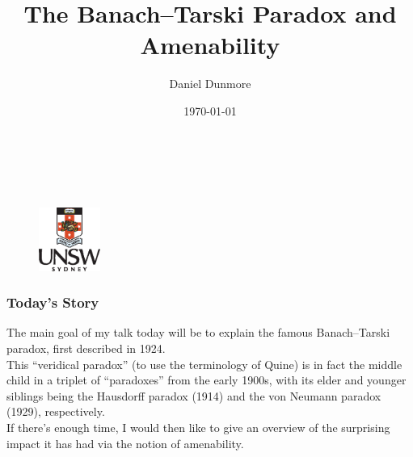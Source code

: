 \documentclass{beamer}
\title[The Banach--Tarski Paradox and Amenability]{The Banach--Tarski Paradox and Amenability}
\author{Daniel Dunmore}
\institute[UNSW]{
	University of New South Wales \\
	\medskip
	\textit{d.dunmore@unsw.edu.au}
}
\date{\today}
\begin{document}

\begin{frame}
\noindent\\[-20pt]
\begin{figure}[!ht]
\titlepage
\noindent\\[-20pt]
\hspace{3.5cm}\hfill\includegraphics[width=2cm]{unsw-crest}\hfill{}
\end{figure}
\end{frame}

\begin{frame}
\frametitle{Today's Story}
\noindent The main goal of my talk today will be to explain the famous Banach--Tarski paradox, first described in 1924.\\[\baselineskip]%

\noindent This ``veridical paradox'' (to use the terminology of Quine) is in fact the middle child in a triplet of ``paradoxes'' from the early 1900s, with its elder and younger siblings being the Hausdorff paradox (1914) and the von Neumann paradox (1929), respectively.\\[\baselineskip]%

\noindent If there's enough time, I would then like to give an overview of the surprising impact it has had via the notion of amenability.
\end{frame}

\end{document}
